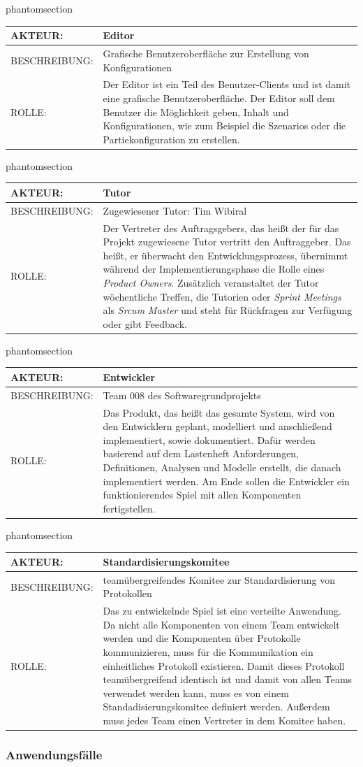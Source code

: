 \documentclass[12pt]{article}
\makeatletter
\newcommand{\labeltext}[2]{%
  \@bsphack
  \csname phantomsection\endcsname %
  \def\@currentlabel{#1}{\label{#2}}%
  \@esphack
}
\newcommand{\akteur}[4]{
\labeltext{#2}{#1}
\begin{tabularx}{16cm}{|l|X|}
\hline 
AKTEUR: & #2 \\
\hline
BESCHREIBUNG: & #3 \\
\hline
ROLLE: & #4 \\ 
\hline
\end{tabularx}
}
\makeatother
\begin{document}
\akteur{A-Editor}{Editor}{Grafische Benutzeroberfläche zur Erstellung von Konfigurationen}{Der Editor ist ein Teil des Benutzer-Clients und ist damit eine grafische Benutzeroberfläche. Der Editor soll dem Benutzer die Möglichkeit geben, Inhalt und Konfigurationen, wie zum Beispiel die Szenarios oder die Partiekonfiguration zu erstellen.}


\akteur{A-Tutor}{Tutor}{Zugewiesener Tutor: Tim Wibiral}{Der Vertreter des Auftragsgebers, das heißt der für das Projekt zugewiesene Tutor vertritt den Auftraggeber. Das heißt, er überwacht den Entwicklungsprozess, übernimmt während der Implementierungsphase die Rolle eines \textit{Product Owners}. Zusätzlich veranstaltet der Tutor wöchentliche Treffen, die Tutorien oder \textit{Sprint Meetings} als \textit{Srcum Master} und steht für Rückfragen zur Verfügung oder gibt Feedback.}

\akteur{A-Entwickler}{Entwickler}{Team 008 des Softwaregrundprojekts}{Das Produkt, das heißt das gesamte System, wird von den Entwicklern geplant, modelliert und anschließend implementiert, sowie dokumentiert. Dafür werden basierend auf dem Lastenheft Anforderungen, Definitionen, Analysen und Modelle erstellt, die danach implementiert werden. Am Ende sollen die Entwickler ein funktionierendes Spiel mit allen Komponenten fertigstellen.}

\akteur{A-Standardisierungskomitee}{Standardisierungskomitee}{teamübergreifendes Komitee zur Standardisierung von Protokollen}{Das zu entwickelnde Spiel ist eine verteilte Anwendung. Da nicht alle Komponenten von einem Team entwickelt werden und die Komponenten über Protokolle kommunizieren, muss für die Kommunikation ein einheitliches Protokoll existieren. Damit dieses Protokoll teamübergreifend identisch ist und damit von allen Teams verwendet werden kann, muss es von einem Standadisierungskomitee definiert werden. Außerdem muss jedes Team einen Vertreter in dem Komitee haben.}

\subsubsection{Anwendungsfälle}
\label{sssec:use-cases}
\end{document}
